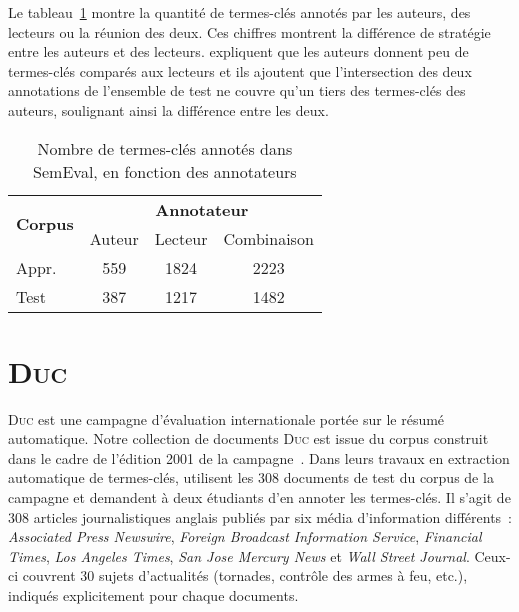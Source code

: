     Le tableau~\ref{tab:semeval_annotators} montre la quantité de termes-clés
    annotés par les auteurs, des lecteurs ou la réunion des deux. Ces chiffres
    montrent la différence de stratégie entre les auteurs et des lecteurs.
     expliquent que les auteurs donnent peu de
    termes-clés comparés aux lecteurs et ils ajoutent que l'intersection des
    deux annotations de l'ensemble de test ne couvre qu'un tiers des termes-clés
    des auteurs, soulignant ainsi la différence entre les deux.

    \begin{table}[!h]
      \centering
      \begin{tabular}{l|ccc}
        \toprule
        \multirow{2}{*}{\textbf{Corpus}} & \multicolumn{3}{c}{\textbf{Annotateur}}\\
        \cline{2-4}
        & Auteur & Lecteur & Combinaison\\
        \hline
        \hfill{}Appr. & 559 & 1824 & 2223\\
        \hfill{}Test & 387 & 1217 & 1482\\
        \bottomrule
      \end{tabular}

      \caption{Nombre de termes-clés annotés dans SemEval, en fonction des
               annotateurs
               \label{tab:semeval_annotators}}
    \end{table}


  \section[\textsc{Duc}]{\textsc{Duc}~\textnormal{\large\cite{wan2008expandrank}}}
  \label{sec:main-data_description-duc_data}
    \textsc{Duc} est une campagne d'évaluation internationale portée sur le
    résumé automatique. Notre collection de documents \textsc{Duc} est issue du
    corpus construit dans le cadre de l'édition 2001 de la
    campagne~\cite{over2001duc}. Dans leurs travaux en extraction automatique de
    termes-clés,  utilisent les 308 documents de test
    du corpus de la campagne et demandent à deux étudiants d'en annoter les
    termes-clés. Il s'agit de 308 articles journalistiques  anglais publiés par
    six média d'information différents~: \textit{Associated Press Newswire},
    \textit{Foreign Broadcast Information Service}, \textit{Financial Times},
    \textit{Los Angeles Times}, \textit{San Jose Mercury News} et \textit{Wall
    Street Journal}. Ceux-ci couvrent 30 sujets d'actualités (tornades, contrôle
    des armes à feu, etc.), indiqués explicitement pour chaque documents.
    
